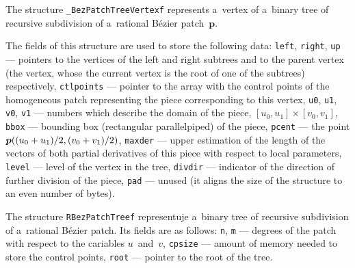 \vspace{\bigskipamount}
\hspace*{\parindent}The structure \texttt{\_BezPatchTreeVertexf} represents
a~vertex of a~binary tree of recursive subdivision of a~rational
B\'{e}zier patch~$\bm{p}$.

The fields of this structure are used to store the following data:
\texttt{left}, \texttt{right}, \texttt{up} --- pointers to the vertices of
the left and right subtrees and to the parent vertex (the vertex,
whose the current vertex is the root of one of the subtrees) respectively,
\texttt{ctlpoints} --- pointer to the array with the control points
of the homogeneous patch representing the piece corresponding to this vertex,
\texttt{u0}, \texttt{u1}, \texttt{v0}, \texttt{v1}
--- numbers which describe the domain of the piece, $[u_0,u_1]\times[v_0,v_1]$,
\texttt{bbox} --- bounding box (rectangular parallelpiped) of the piece,
\texttt{pcent} --- the point
$\bm{p}((u_0\nolinebreak +\nolinebreak u_1)/2,
(v_0\nolinebreak +\nolinebreak v_1)/2)$, \texttt{maxder}
--- upper estimation of the length of the vectors of both partial derivatives
of this piece with respect to local parameters, \texttt{level} --- level of
the vertex in the tree, \texttt{divdir} --- indicator of the direction
of further division of the piece, \texttt{pad} --- unused (it aligns the
size of the structure to an even number of bytes).

\vspace{\bigskipamount}
The structure \texttt{RBezPatchTreef} representuje a~binary tree of recursive
subdivision of a~rational B\'{e}zier patch. Its fields are as follows:
\texttt{n}, \texttt{m} --- degrees of the patch with respect
to the cariables $u$~and~$v$,
\texttt{cpsize} --- amount of memory needed to store the control points,
\texttt{root} --- pointer to the root of the tree.

